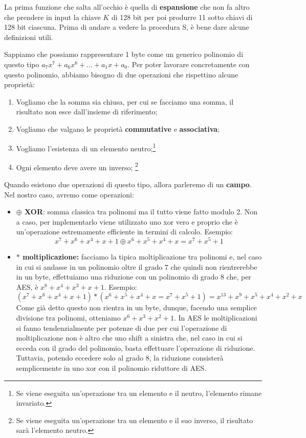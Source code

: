La prima funzione che salta all'occhio è quella di \textbf{espansione} che non fa altro che prendere in input la chiave $K$ di 128 bit per poi produrre 11 sotto chiavi di 128 bit ciascuna. Prima di andare a vedere la procedura S, è bene dare alcune definizioni utili.

Sappiamo che possiamo rappresentare 1 byte come un generico polinomio di questo tipo $a_7x^7+a_6x^6+...+a_1x+a_0$. Per poter lavorare concretamente con questo polinomio, abbiamo bisogno di due operazioni che rispettino alcune proprietà:
\begin{enumerate}
    \item Vogliamo che la somma sia chiusa, per cui se facciamo una somma, il risultato non esce dall'insieme di riferimento;
    \item Vogliamo che valgano le proprietà \textbf{commutative} e \textbf{associativa};
    \item Vogliamo l'esistenza di un elemento neutro;\footnote{Se viene eseguita un'operazione tra un elemento e il neutro, l'elemento rimane invariato.}
    \item Ogni elemento deve avere un inverso; \footnote{Se viene eseguita un'operazione tra un elemento e il suo inverso, il risultato sarà l'elemento neutro.}
\end{enumerate}
Quando esistono due operazioni di questo tipo, allora parleremo di un \textbf{campo}. Nel nostro caso, avremo come operazioni:
\begin{itemize}
    \item \textbf{$\oplus$ XOR}: somma classica tra polinomi ma il tutto viene fatto modulo 2. Non a caso, per implementarlo viene utilizzato uno xor vero e proprio che è un'operazione estremamente efficiente in termini di calcolo. Esempio: 
    \[x^7+x^6+x^4+x+1 \oplus x^6+x^5+x^4+x = x^7+x^5+1\]
    \item \textbf{$*$ moltiplicazione:} facciamo la tipica moltiplicazione tra polinomi e, nel caso in cui si andasse in un polinomio oltre il grado 7 che quindi non rientrerebbe in un byte, effettuiamo una riduzione con un polinomio di grado 8 che, per AES, è $x^8+x^4+x^3+x+1$. Esempio:
    \[(x^7+x^6+x^4+x+1) * (x^6+x^5+x^4+x = x^7+x^5+1) = x^{13}+x^9+x^5+x^4+x^2+x\]
    Come già detto questo non rientra in un byte, dunque, facendo una semplice divisione tra polinomi, otteniamo $x^6+x^3+x^2+1$. In AES le moltiplicazioni si fanno tendenzialmente per potenze di due per cui l'operazione di moltiplicazione non è altro che uno shift a sinistra che, nel caso in cui si ecceda con il grado del polinomio, basta effettuare l'operazione di riduzione. Tuttavia, potendo eccedere solo al grado 8, la riduzione consisterà semplicemente in uno xor con il polinomio riduttore di AES.
\end{itemize}

